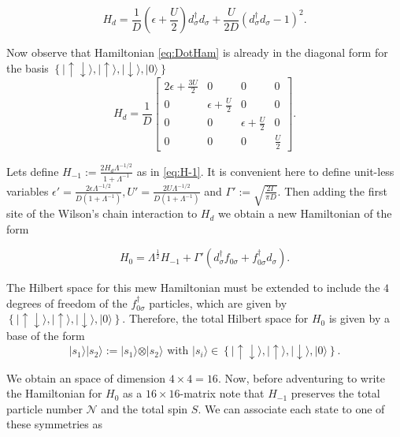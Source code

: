 \begin{equation}
H_{d}=\frac{1}{D}\left(\epsilon+\frac{U}{2}\right)d_{\sigma}^{\dagger}d_{\sigma}+\frac{U}{2D}(d_{\sigma}^{\dagger}d_{\sigma}-1)^{2}.\label{eq:DotHam}
\end{equation}


\noindent Now observe that Hamiltonian \eqref{eq:DotHam} is already in the
diagonal form for the basis $\left\{ \vert\uparrow\!\downarrow\rangle,\vert\uparrow\rangle,\vert\downarrow\rangle,\vert0\rangle\right\} $
\[
H_{d}=\frac{1}{D}\left[\begin{array}{cccc}
2\epsilon+\frac{3U}{2} & 0 & 0 & 0\\
0 & \epsilon+\frac{U}{2} & 0 & 0\\
0 & 0 & \epsilon+\frac{U}{2} & 0\\
0 & 0 & 0 & \frac{U}{2}
\end{array}\right].
\]


Lets define $H_{-1} := \frac{2 H_d \Lambda^{-1/2}}{1+\Lambda^{-1}}$ as in \ref{eq:H-1}. It is convenient here to define unit-less variables $\epsilon' =\frac{2\epsilon \Lambda^{-1/2}}{D(1+\Lambda^{-1})}, U'= \frac{2U\Lambda^{-1/2}}{D(1+\Lambda^{-1})}$ and $\Gamma':=\sqrt{\frac{2\Gamma}{\pi D}}$. Then adding the first site of the Wilson's chain interaction to $H_{d}$ we obtain a new Hamiltonian of the form 

\begin{equation}
H_{0}=\Lambda^{\frac{1}{2}}H_{-1}+\Gamma'\left(d_{\sigma}^{\dagger}f_{0\sigma}+f_{0\sigma}^{\dagger}d_{\sigma}\right).\label{eq:H0fromH-1}
\end{equation}



The Hilbert space for this mew Hamiltonian must be extended to include
the $4$ degrees of freedom of the $f_{0\sigma}^{\dagger}$ particles,
which are given by $\left\{ \vert\uparrow\!\downarrow\rangle,\vert\uparrow\rangle,\vert\downarrow\rangle,\vert0\rangle\right\} $.
Therefore, the total Hilbert space for $H_{0}$ is given by a base
of the form 
\[
\vert s_{1}\rangle\vert s_{2}\rangle:=\vert s_{1}\rangle\otimes\vert s_{2}\rangle\mbox{ with }\vert s_{i}\rangle\in\left\{ \vert\uparrow\!\downarrow\rangle,\vert\uparrow\rangle,\vert\downarrow\rangle,\vert0\rangle\right\} .
\]


\noindent We obtain an space of dimension $4\times4=16.$ Now, before adventuring
to write the Hamiltonian for $H_{0}$ as a $16\times16$-matrix note
that $H_{-1}$ preserves the total particle number $\mathcal{N}$ and the total spin $S$. We can associate each state to one of these symmetries as 

